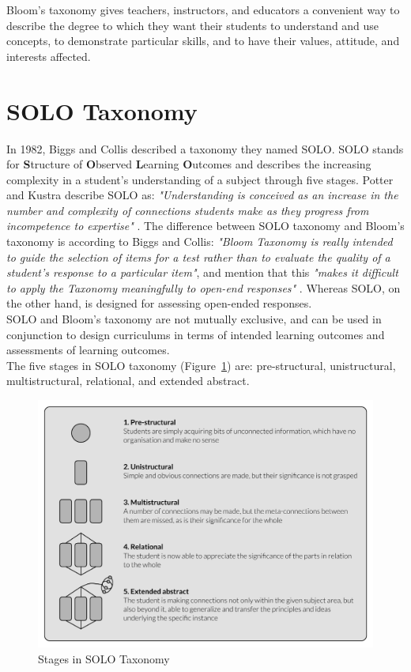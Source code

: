 \noindent 
Bloom's taxonomy gives teachers, instructors, and educators a convenient way to describe the degree to which they want their students to understand and use concepts, to demonstrate particular skills, and to have their values, attitude, and interests affected.

\section{SOLO Taxonomy}

In 1982, Biggs and Collis described a taxonomy they named SOLO. SOLO stands for \textbf{S}tructure of \textbf{O}bserved \textbf{L}earning \textbf{O}utcomes and describes the increasing complexity in a student's understanding of a subject through five stages.
Potter and Kustra describe SOLO as: \textit{"Understanding is conceived as an increase in the number and complexity of connections students make as they progress from incompetence to expertise"} \cite[p. 9]{potter2012primer}.
The difference between SOLO taxonomy and Bloom's taxonomy is according to Biggs and Collis: \textit{"Bloom Taxonomy is really intended to guide the selection of items for a test rather than to evaluate the quality of a student's response to a particular item"}, and mention that this \textit{"makes it difficult to apply the Taxonomy meaningfully to open-end responses"} \cite[p. 13]{biggs1982evaluating}. Whereas SOLO, on the other hand, is designed for assessing open-ended responses. \\

\noindent
SOLO and Bloom's taxonomy are not mutually exclusive, and can be used in conjunction to design curriculums in terms of intended learning outcomes and assessments of learning outcomes. \\

\noindent
The five stages in SOLO taxonomy (Figure~\ref{fig:solo_taxonomy}) are: pre-structural, unistructural, multistructural, relational, and extended abstract.

\begin{figure}[H]
\centering
\includegraphics[width=\textwidth]{figures/solo_taxonomy}
\caption{Stages in SOLO Taxonomy \cite{atherton2013solo}}
\label{fig:solo_taxonomy}
\end{figure}

